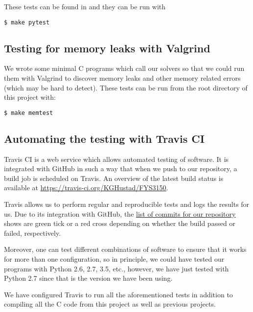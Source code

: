These tests can be found in  and they can be run with
\begin{verbatim}
$ make pytest
\end{verbatim}


\subsection{Testing for memory leaks with Valgrind}
We wrote some minimal C programs which call our solvers so that we could run them with Valgrind to discover memory leaks and other memory related errors (which may be hard to detect). These tests can be run from the root directory of this project with:

\begin{verbatim}
$ make memtest
\end{verbatim}

\subsection{Automating the testing with Travis CI}
Travis CI is a web service which allows automated testing of software. It is integrated with GitHub in such a way that when we push to our repository, a build job is scheduled on Travis. An overview of the latest build status is available at \url{https://travis-ci.org/KGHustad/FYS3150}.

Travis allows us to perform regular and reproducible tests and logs the results for us. Due to its integration with GitHub, the \href{https://github.com/KGHustad/FYS3150/commits/master}{list of commits for our repository} shows are green tick or a red cross depending on whether the build passed or failed, respectively.

Moreover, one can test different combinations of software to ensure that it works for more than one configuration, so in principle, we could have tested our programs with Python 2.6, 2.7, 3.5, etc., however, we have just tested with Python 2.7 since that is the version we have been using.

We have configured Travis to run all the aforementioned tests in addition to compiling all the C code from this project as well as previous projects.
